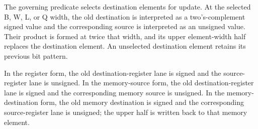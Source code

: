 The governing predicate selects destination elements for update. At the
selected B, W, L, or Q width, the old destination is interpreted as a
two's-complement signed value and the corresponding source is interpreted as an
unsigned value. Their product is formed at twice that width, and its upper
element-width half replaces the destination element. An unselected destination
element retains its previous bit pattern.

In the register form, the old destination-register lane is signed and the
source-register lane is unsigned. In the memory-source form, the old
destination-register lane is signed and the corresponding memory source is
unsigned. In the memory-destination form, the old memory destination is signed
and the corresponding source-register lane is unsigned; the upper half is
written back to that memory element.
